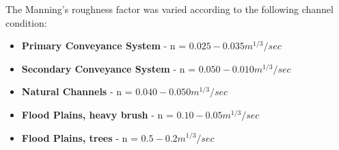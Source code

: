 \clearpage



The Manning's roughness factor was varied according to the following channel condition:

\begin{itemize}

\item \textbf{Primary Conveyance System} - n = $0.025-0.035 m^{1/3}/sec$
\item \textbf{Secondary Conveyance System} - n = $0.050-0.010 m^{1/3}/sec$
\item \textbf{Natural Channels} - n = $0.040-0.050 m^{1/3}/sec$
\item \textbf{Flood Plains, heavy brush} - n = $0.10-0.05 m^{1/3}/sec$
\item \textbf{Flood Plains, trees} - n = $0.5-0.2 m^{1/3}/sec$

\end{itemize}

